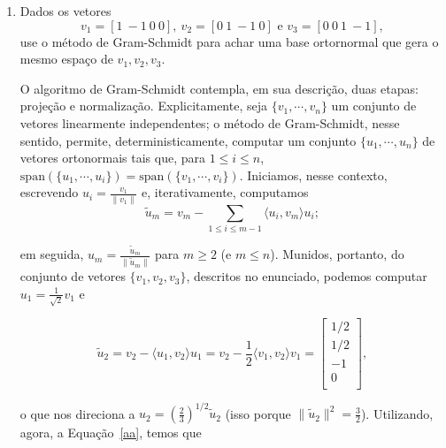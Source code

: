 \documentclass[leqno]{article}
\begin{document}
\begin{enumerate}
\begin{sol}
\end{sol}


\item Dados os vetores
$$v_1 = [1 \ -1 \ 0 \ 0], \ v_2 = [0 \ 1 \ -1 \ 0] \mbox{ e } v_3 = [0 \ 0 \ 1 \ -1],$$
use o método de Gram-Schmidt para achar uma base ortornormal que gera o mesmo espaço de $v_1, v_2, v_3$.

\begin{sol}
	O algoritmo de Gram-Schmidt contempla, em sua descrição, duas etapas: projeção e normalização. Explicitamente, seja $\{v_{1}, \cdots, v_{n}\}$ um conjunto de vetores linearmente independentes; o método de Gram-Schmidt, nesse sentido, permite, deterministicamente, computar um conjunto $\{u_{1}, \cdots, u_{n}\}$ de vetores ortonormais tais que, para $1 \le i \le n$, $\mathrm{span}(\{u_{1}, \cdots, u_{i}\}) = \mathrm{span}(\{v_{1}, \cdots, v_{i}\})$. Iniciamos, nesse contexto, escrevendo $u_{i} = \frac{v_{1}}{\|v_{1}\|}$ e, iterativamente, computamos 
	\begin{equation} \label{aa}  
		\tilde u_{m} = v_{m} - \sum_{1 \le i \le m - 1} \langle u_{i}, v_{m} \rangle u_{i}; 
	\end{equation} 

	\noindent em seguida, $u_{m} = \frac{\tilde u_{m}}{\|\tilde u_{m}\|}$ para $m \ge 2$ (e $m \le n$). Munidos, portanto, do conjunto de vetores $\{v_{1}, v_{2}, v_{3}\}$, descritos no enunciado, podemos computar $u_{1} = \frac{1}{\sqrt{2}}v_{1}$ e 

	\begin{equation*} 
		\tilde u_{2} = v_{2} - \langle u_{1}, v_{2} \rangle u_{1} = v_{2} - \frac{1}{2} \langle v_{1}, v_{2} \rangle v_{1} = 
		\begin{bmatrix} 
			1/2 \\ 
			1/2 \\ 
			-1 \\ 
			0 \\ 
		\end{bmatrix},  
	\end{equation*} 

	\noindent o que nos direciona a $u_{2} = \left(\frac{2}{3}\right)^{1/2}\tilde u_{2}$ (isso porque $\|\tilde u_{2}\|^{2} = \frac{3}{2}$). Utilizando, agora, a Equação~\eqref{aa}, temos que 


\end{sol}
\end{enumerate}
\end{document}
